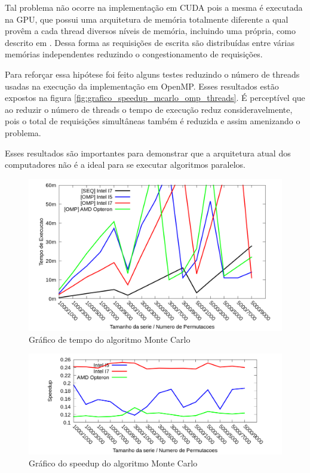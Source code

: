 Tal problema não ocorre na implementação em CUDA pois a mesma é executada na GPU, que possui uma arquitetura de memória totalmente diferente a qual provêm a cada thread diversos níveis de memória, incluindo uma própria, como descrito em \cite{cuda_guide}. Dessa forma as requisições de escrita são distribuídas entre várias memórias independentes reduzindo o congestionamento de requisições.

Para reforçar essa hipótese foi feito alguns testes reduzindo o número de threads usadas na execução da implementação em OpenMP. Esses resultados estão expostos na figura \ref{fig:grafico_speedup_mcarlo_omp_threads}. É perceptível que ao reduzir o número de threads o tempo de execução reduz consideravelmente, pois o total de requisições simultâneas também é reduzida e assim amenizando o problema.

Esses resultados são importantes para demonstrar que a arquitetura atual dos computadores não é a ideal para se executar algoritmos paralelos.

\begin{figure}[H]
\centering
\includegraphics[width=1.0\textwidth]{Imagens/graficos_mcarlo/mcarlo_tempos_omp.png}
\caption{Gráfico de tempo do algoritmo Monte Carlo}
\label{fig:grafico_tempo_mcarlo_omp}
\end{figure}

\begin{figure}[H]
\centering
\includegraphics[width=1.0\textwidth]{Imagens/graficos_mcarlo/mcarlo_speedup_omp.png}
\caption{Gráfico do speedup do algoritmo Monte Carlo}
\label{fig:grafico_speedup_mcarlo_omp}
\end{figure}

